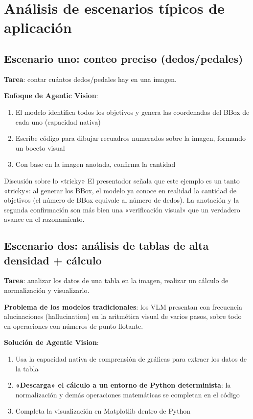\section{Análisis de escenarios típicos de aplicación}

\subsection{Escenario uno: conteo preciso (dedos/pedales)}

\textbf{Tarea}: contar cuántos dedos/pedales hay en una imagen.

\textbf{Enfoque de Agentic Vision}:
\begin{enumerate}
    \item El modelo identifica todos los objetivos y genera las coordenadas del BBox de cada uno (capacidad nativa)
    \item Escribe código para dibujar recuadros numerados sobre la imagen, formando un boceto visual
    \item Con base en la imagen anotada, confirma la cantidad
\end{enumerate}

\begin{warningbox}{Discusión sobre lo «tricky»}
El presentador señala que este ejemplo es un tanto «tricky»: al generar los BBox, el modelo ya conoce en realidad la cantidad de objetivos (el número de BBox equivale al número de dedos). La anotación y la segunda confirmación son más bien una «verificación visual» que un verdadero avance en el razonamiento.
\end{warningbox}

\subsection{Escenario dos: análisis de tablas de alta densidad + cálculo}

\textbf{Tarea}: analizar los datos de una tabla en la imagen, realizar un cálculo de normalización y visualizarlo.

\textbf{Problema de los modelos tradicionales}: los VLM presentan con frecuencia alucinaciones (hallucination) en la aritmética visual de varios pasos, sobre todo en operaciones con números de punto flotante.

\textbf{Solución de Agentic Vision}:
\begin{enumerate}
    \item Usa la capacidad nativa de comprensión de gráficas para extraer los datos de la tabla
    \item \textbf{«Descarga» el cálculo a un entorno de Python determinista}: la normalización y demás operaciones matemáticas se completan en el código
    \item Completa la visualización en Matplotlib dentro de Python
\end{enumerate}

